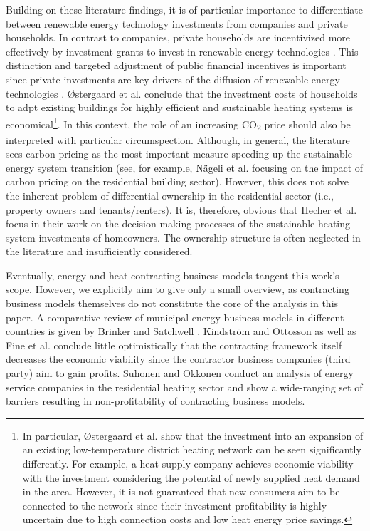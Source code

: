 Building on these literature findings, it is of particular importance to differentiate between renewable energy technology investments from companies and private households. In contrast to companies, private households are incentivized more effectively by investment grants to invest in renewable energy technologies \cite{roth2020impact}. This distinction and targeted adjustment of public financial incentives is important since private investments are key drivers of the diffusion of renewable energy technologies \cite{wustenhagen2012strategic}. {\O}stergaard et al. \cite{ostergaard2019costs} conclude that the investment costs of households to adpt existing buildings for highly efficient and sustainable heating systems is economical\footnote{In particular, {\O}stergaard et al. \cite{ostergaard2019costs} show that the investment into an expansion of an existing low-temperature district heating network can be seen significantly differently. For example, a heat supply company achieves economic viability with the investment considering the potential of newly supplied heat demand in the area. However, it is not guaranteed that new consumers aim to be connected to the network since their investment profitability is highly uncertain due to high connection costs and low heat energy price savings.}. In this context, the role of an increasing CO\textsubscript{2} price should also be interpreted with particular circumspection. Although, in general, the literature sees carbon pricing as the most important measure speeding up the sustainable energy system transition (see, for example, Nägeli et al. \cite{nageli2020policies} focusing on the impact of carbon pricing on the residential building sector). However, this does not solve the inherent problem of differential ownership in the residential sector (i.e., property owners and tenants/renters). It is, therefore, obvious that Hecher et al. \cite{hecher2017trigger} focus in their work on the decision-making processes of the sustainable heating system investments of homeowners. The ownership structure is often neglected in the literature and insufficiently considered.\vspace{0.5cm} 

Eventually, energy and heat contracting business models tangent this work's scope. However, we explicitly aim to give only a small overview, as contracting business models themselves do not constitute the core of the analysis in this paper. A comparative review of municipal energy business models in different countries is given by Brinker and Satchwell \cite{brinker2020comparative}. Kindström and Ottosson \cite{kindstrom2016local} as well as Fine et al. \cite{fina2020profitability} conclude little optimistically that the contracting framework itself decreases the economic viability since the contractor business companies (third party) aim to gain profits. Suhonen and Okkonen \cite{suhonen2013energy} conduct an analysis of energy service companies in the residential heating sector and show a wide-ranging set of barriers resulting in non-profitability of contracting business models.

